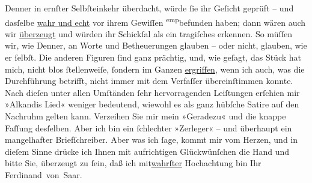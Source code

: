 \begin{ledgroupsized}[t]{13cm}
                  Denner in ernſter
               Selbſteinkehr überdacht, würde ſie ihr Geſicht geprüft – und dasſelbe \uline{wahr und echt} vor ihrem Gewiſſen \substVorne{}\textsuperscript{emp}\substDazwischen{}be\substHinten{}funden haben; dann wären auch wir \uline{überzeugt}
               und würden ihr Schickſal als ein tragiſches erkennen. So müſſen wir, wie Denner, an Worte und
               Betheuerungen glauben – oder nicht, glauben, wie er ſelbſt. Die anderen Figuren ſind
               ganz prächtig, und, wie geſagt, das Stück hat mich, nicht blos ſtellenweiſe, ſondern im Ganzen \uline{ergriffen}, wenn ich auch, was die Durchführung
               betrifft, nicht immer mit dem Verfaſſer übereinſtimmen konnte. Nach dieſen unter
               allen Umſtänden ſehr hervorragenden Leiſtungen erſchien mir »Alkandis Lied« weniger bedeutend, wiewohl es als ganz hübſche
               Satire auf den Nachruhm gelten kann.\pend
           \pstart
           Verzeihen Sie mir mein »Geradezu« und die knappe Faſſung desſelben. Aber ich bin {\pb}ein ſchlechter »Zerleger« – und überhaupt ein
               mangelhafter Briefſchreiber. Aber was ich ſage, kommt mir vom Herzen, und in dieſem
               Sinne drücke ich Ihnen mit aufrichtigen Glückwünſchen die Hand und bitte Sie,
               überzeugt zu ſein, daß ich \introOben{}mit\introOben{}{ }\uline{wahrſter} Hochachtung bin\pend
           \pstart Ihr \spacefill\mbox{Ferdinand von Saar.}\pend{}
         
         \endnumbering{}\end{ledgroupsized}  \newcommand{\dateiname}{L00296}\newcommand{\titel}{Ferdinand von Saar an Arthur Schnitzler, 5. 2. 1894}\newcommand{\editorInnen}{Martin Anton Müller und Gerd-Hermann Susen}
      